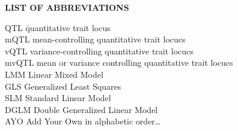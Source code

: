 {}

\begin{center}
{\Large \textbf{LIST OF ABBREVIATIONS}}
\end{center}

\newcommand{\Ab}[2]{\noindent  #1 \> #2 \\}
\newcommand{\Abi}[2]{\noindent #1 \hspace{1.5cm} \= #2 \\}

\begin{tabbing}
\Abi{QTL}{quantitative trait locus}
\Ab{mQTL}{mean-controlling quantitative trait locucs}
\Ab{vQTL}{variance-controlling quantitative trait locucs}
\Ab{mvQTL}{mean or variance controlling quantitative trait locucs}
\Ab{LMM}{Linear Mixed Model}
\Ab{GLS}{Generalized Least Squares}
\Ab{SLM}{Standard Linear Model}
\Ab{DGLM}{Double Generalized Linear Model}
\Ab{AYO}{Add Your Own in alphabetic order\ldots}
\end{tabbing}

\clearpage
